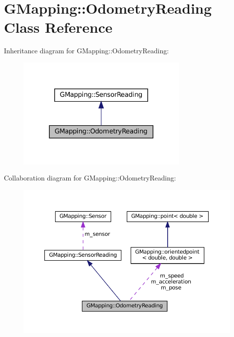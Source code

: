 \hypertarget{classGMapping_1_1OdometryReading}{}\section{G\+Mapping\+:\+:Odometry\+Reading Class Reference}
\label{classGMapping_1_1OdometryReading}


Inheritance diagram for G\+Mapping\+:\+:Odometry\+Reading\+:
\nopagebreak
\begin{figure}[H]
\begin{center}
\leavevmode
\includegraphics[width=239pt]{classGMapping_1_1OdometryReading__inherit__graph}
\end{center}
\end{figure}


Collaboration diagram for G\+Mapping\+:\+:Odometry\+Reading\+:
\nopagebreak
\begin{figure}[H]
\begin{center}
\leavevmode
\includegraphics[width=350pt]{classGMapping_1_1OdometryReading__coll__graph}
\end{center}
\end{figure}
